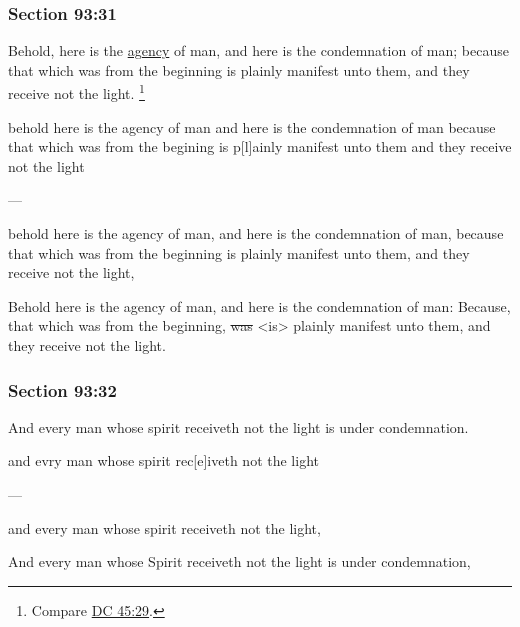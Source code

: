 	\subsubsection{Section 93:31} %
		\label{DC93-31}

		Behold, here is the \hyperref[AGENCY]{agency} of man, and here is the condemnation of man; because that which was from the beginning is plainly manifest unto them, and they receive not the light.%
			\footnote{%
				Compare \hyperref[DC45-29]{DC 45:29}.
				}

		\begin{framed}
		\scriptsize
			\begin{compactdesc}
				\item[JSP] behold here is the agency of man and here is the condemnation of man because that which was from the begining is p[l]ainly manifest unto them and they receive not the light
				\item[BC] ---
				\item[RB2] behold here is the agency of man, and here is the condemnation of man, because that which was from the beginning is plainly manifest unto them, and they receive not the light, 
				\item[RB1] Behold here is the agency of man, and here is the condemnation of man: Because, that which was from the beginning, \sout{was} <is> plainly manifest unto them, and they receive not the light. 
			\end{compactdesc}
		\end{framed}

	\subsubsection{Section 93:32} %
		\label{DC93-32}

		And every man whose spirit receiveth not the light is under condemnation.

		\begin{framed}
		\scriptsize
			\begin{compactdesc}
				\item[JSP] and evry man whose spirit rec[e]iveth not the light
				\item[BC] ---
				\item[RB2] and every man whose spirit receiveth not the light, 
				\item[RB1] And every man whose Spirit receiveth not the light is under condemnation, 
			\end{compactdesc}
		\end{framed}

